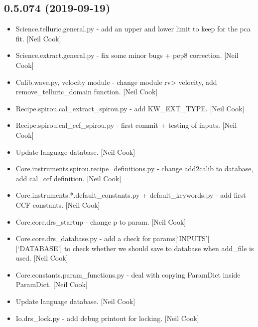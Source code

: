 \documentclass[a4paper,10pt,english]{report}
\begin{document}
\subsection{0.5.074 (2019-09-19)}
\label{\detokenize{misc/changelog:id67}}\begin{itemize}
\item {} 
Science.telluric.general.py - add an upper and lower limit to keep for
the pca fit. {[}Neil Cook{]}

\item {} 
Science.extract.general.py - fix some minor bugs + pep8 correction.
{[}Neil Cook{]}

\item {} 
Calib.wave.py, velocity module - change module rv\textendash{}\textgreater{} velocity, add
remove\_telluric\_domain function. {[}Neil Cook{]}

\item {} 
Recipe.spirou.cal\_extract\_spirou.py - add KW\_EXT\_TYPE. {[}Neil Cook{]}

\item {} 
Recipe.spirou.cal\_ccf\_spirou.py - first commit + testing of inputs.
{[}Neil Cook{]}

\item {} 
Update language database. {[}Neil Cook{]}

\item {} 
Core.instruments.spirou.recipe\_definitions.py - change \textendash{}add2calib to
\textendash{}database, add cal\_ccf definition. {[}Neil Cook{]}

\item {} 
Core.instruments.*.default\_constants.py + default\_keywords.py - add
first CCF constants. {[}Neil Cook{]}

\item {} 
Core.core.drs\_startup - change p to param. {[}Neil Cook{]}

\item {} 
Core.core.drs\_database.py - add a check for
params{[}‘INPUTS’{]}{[}‘DATABASE’{]} to check whether we should save to
database when add\_file is used. {[}Neil Cook{]}

\item {} 
Core.constants.param\_functions.py - deal with copying ParamDict inside
ParamDict. {[}Neil Cook{]}

\item {} 
Update language database. {[}Neil Cook{]}

\item {} 
Io.drs\_lock.py - add debug printout for locking. {[}Neil Cook{]}


\end{itemize}
\end{document}
